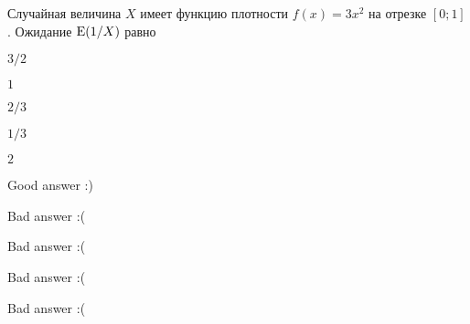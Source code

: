 
\begin{question}
Случайная величина \(X\) имеет функцию плотности \(f(x) = 3x^2\) на
отрезке \([0;1]\). Ожидание \(\operatorname{E}(1/X)\) равно
\begin{answerlist}
  \item \(3/2\)
  \item \(1\)
  \item \(2/3\)
  \item \(1/3\)
  \item \(2\)
\end{answerlist}
\end{question}

\begin{solution}
\begin{answerlist}
  \item Good answer :)
  \item Bad answer :(
  \item Bad answer :(
  \item Bad answer :(
  \item Bad answer :(
\end{answerlist}
\end{solution}

